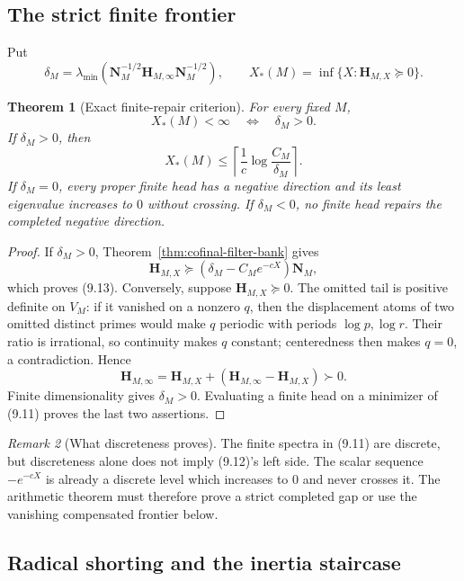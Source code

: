 \documentclass[11pt]{amsart}
\newtheorem{theorem}{Theorem}[section]
\theoremstyle{definition}
\theoremstyle{remark}
\newtheorem{remark}[theorem]{Remark}
\begin{document}
\subsection{The strict finite frontier}

Put
\[
 \delta_M=
 \lambda_{\min}\!\left(
 \mathbf N_M^{-1/2}\mathbf H_{M,\infty}
 \mathbf N_M^{-1/2}\right),
\qquad
 X_*(M)=\inf\{X:\mathbf H_{M,X}\succeq0\}.
\tag{9.11}
\]

\begin{theorem}[Exact finite-repair criterion]
\label{thm:exact-finite-repair}
For every fixed \(M\),
\[
 \boxed{X_*(M)<\infty\quad\Longleftrightarrow\quad\delta_M>0.}
\tag{9.12}
\]
If \(\delta_M>0\), then
\[
 X_*(M)\le
 \left\lceil\frac1c\log\frac{C_M}{\delta_M}\right\rceil .
\tag{9.13}
\]
If \(\delta_M=0\), every proper finite head has a negative direction and
its least eigenvalue increases to \(0\) without crossing.  If
\(\delta_M<0\), no finite head repairs the completed negative direction.
\end{theorem}

\begin{proof}
If \(\delta_M>0\), Theorem~\ref{thm:cofinal-filter-bank} gives
\[
 \mathbf H_{M,X}\succeq
 (\delta_M-C_Me^{-cX})\mathbf N_M,
\]
which proves (9.13).  Conversely, suppose
\(\mathbf H_{M,X}\succeq0\).  The omitted tail is positive definite on
\(V_M\): if it vanished on a nonzero \(q\), then the displacement atoms
of two omitted distinct primes would make \(q\) periodic with periods
\(\log p,\log r\).  Their ratio is irrational, so continuity makes \(q\)
constant; centeredness then makes \(q=0\), a contradiction.  Hence
\[
 \mathbf H_{M,\infty}
 =\mathbf H_{M,X}
  +(\mathbf H_{M,\infty}-\mathbf H_{M,X})\succ0.
\]
Finite dimensionality gives \(\delta_M>0\).  Evaluating a finite head on a
minimizer of (9.11) proves the last two assertions.
\end{proof}

\begin{remark}[What discreteness proves]
The finite spectra in (9.11) are discrete, but discreteness alone does not
imply (9.12)'s left side.  The scalar sequence \(-e^{-cX}\) is already a
discrete level which increases to \(0\) and never crosses it.  The
arithmetic theorem must therefore prove a strict completed gap or use the
vanishing compensated frontier below.
\end{remark}

\subsection{Radical shorting and the inertia staircase}
\end{document}
